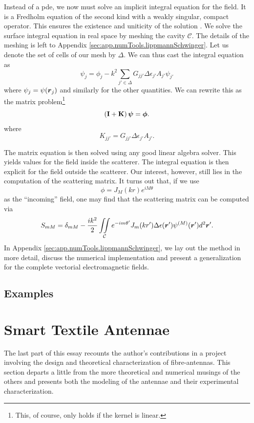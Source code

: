 Instead of a \gls{pde}, we now must solve an implicit 
integral equation for the field. It is a Fredholm 
equation of the second kind with a weakly singular, compact
operator. This ensures the existence
and uniticity of the solution \cite{GOH1981,COL2013}.
We solve the surface integral equation in real space by meshing
the cavity $\mathcal{C}$. The details of the meshing is left to 
Appendix \ref{sec:app.numTools.lippmannSchwinger}. Let us denote the set
of cells of our mesh by $\Delta$. We can thus cast the integral
equation as
	\begin{equation}
		\psi_j = \phi_j -k^2\sum_{j'\in\Delta} G_{jj'}\Delta\epsilon_{j'}A_{j'}\psi_{j'}
	\end{equation}
where $\psi_j=\psi(\boldsymbol{r}_j)$ and similarly for the other quantities. We can
rewrite this as the matrix problem\footnote{This, of course, only holds if the
kernel is linear.} 
	\begin{equation}
		\left(\mathbf{I}+\mathbf{K}\right)\boldsymbol{\psi}=\boldsymbol{\phi}.
	\end{equation}
where 
	\begin{equation}
		K_{jj'} = G_{jj'}\Delta\epsilon_{j'}A_{j'}.
	\end{equation}

The matrix equation is then solved using any good 
linear algebra solver. This yields values for the
field inside the scatterer. The integral equation
is then explicit for the field outside the scatterer. 
Our interest, however, still lies in the computation
of the scattering matrix. It turns out that, if we
use 
	\begin{equation}
		\phi = J_M(kr)e^{iM\theta}
	\end{equation}
as the ``incoming'' field, one may find that the scattering
matrix can be computed via
	\begin{equation}
		S_{mM} = \delta_{mM} - \frac{ik^2}{2}\mathop{\iint}_\mathcal{C}e^{-im{\theta'}}J_m(kr')\Delta\epsilon(\boldsymbol{r}')\psi^{(M)}(\boldsymbol{r}')d^2\boldsymbol{r}'.
	\end{equation}
In Appendix \ref{sec:app.numTools.lippmannSchwinger}, we lay out the method in more detail, 
discuss the numerical implementation and present a generalization for the complete 
vectorial electromagnetic fields.

\subsection{Examples}

\section{Smart Textile Antennae}
The last part of this essay recounts the author's contributions
in a project involving the design and theoretical characterization
of fibre-antennas. This section departs a little from the more theoretical
and numerical musings of the others and presents both the modeling of the 
antennae and their experimental characterization.   

